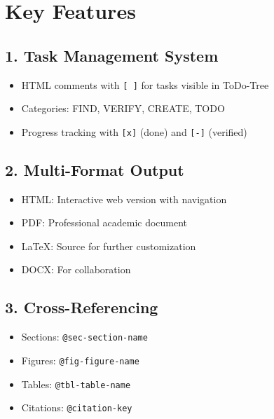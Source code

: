 \documentclass[
  11pt,
  letterpaper,
]{book}
\providecommand{\tightlist}{%
  \setlength{\itemsep}{0pt}\setlength{\parskip}{0pt}}
\begin{document}

\section*{Key Features}\label{key-features}


\subsection*{1. Task Management System}\label{task-management-system}

\begin{itemize}
\tightlist
\item
  HTML comments with \texttt{{[}\ {]}} for tasks visible in ToDo-Tree
\item
  Categories: FIND, VERIFY, CREATE, TODO
\item
  Progress tracking with \texttt{{[}x{]}} (done) and \texttt{{[}-{]}}
  (verified)
\end{itemize}

\subsection*{2. Multi-Format Output}\label{multi-format-output}

\begin{itemize}
\tightlist
\item
  HTML: Interactive web version with navigation
\item
  PDF: Professional academic document
\item
  LaTeX: Source for further customization
\item
  DOCX: For collaboration
\end{itemize}

\subsection*{3. Cross-Referencing}\label{cross-referencing}

\begin{itemize}
\tightlist
\item
  Sections: \texttt{@sec-section-name}
\item
  Figures: \texttt{@fig-figure-name}
\item
  Tables: \texttt{@tbl-table-name}
\item
  Citations: \texttt{@citation-key}
\end{itemize}
\end{document}
